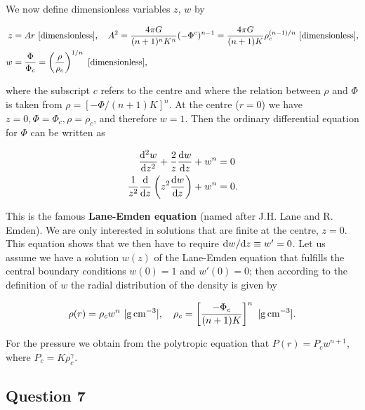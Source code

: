 \documentclass[a4paper,10pt]{article}
\begin{document}
{\noindent}We now define dimensionless variables $z$, $w$ by

\begin{align*}
    z &= Ar ~ [{\rm dimensionless}], ~~~ A^2 = \frac{4\pi G}{(n+1)^nK^n}(-\Phi^c)^{n-1} = \frac{4\pi G}{(n+1)K}\rho_c^{(n-1)/n} ~ [{\rm dimensionless}],\\
    w &= \frac{\Phi}{\Phi_c} = \left(\frac{\rho}{\rho_c}\right)^{1/n} ~ [{\rm dimensionless}],
\end{align*}

{\noindent}where the subscript $c$ refers to the centre and where the relation between $\rho$ and $\Phi$ is taken from $\rho=[-\Phi/(n+1)K]^n$. At the centre ($r=0$) we have $z=0, \Phi=\Phi_c, \rho=\rho_c$, and therefore $w=1$. Then the ordinary differential equation for $\Phi$ can be written as

\begin{align*}
    \frac{{\rm d}^2w}{{\rm d}z^2} +\frac{2}{z}\frac{{\rm d}w}{{\rm d}z} + w^n &= 0 \\
    \frac{1}{z^2}\frac{{\rm d}}{{\rm d}z} \left(z^2 \frac{{\rm d}w}{{\rm d}z}\right) + w^n &= 0.
\end{align*}

{\noindent}This is the famous \textbf{Lane-Emden equation} (named after J.H. Lane and R. Emden). We are only interested in solutions that are finite at the centre, $z=0$. This equation shows that we then have to require ${\rm d}w/{\rm d}z\equiv w'=0$. Let us assume we have a solution $w(z)$ of the Lane-Emden equation that fulfills the central boundary conditions $w(0)=1$ and $w'(0)=0$; then according to the definition of $w$ the radial distribution of the density is given by

\begin{align*}
    \rho(r) = \rho_cw^n ~ [{\rm g\,cm^{-3}}], ~~~ \rho_c = \left[ \frac{-\Phi_c}{(n+1)K} \right]^n ~ [{\rm g\,cm^{-3}}].
\end{align*}

{\noindent}For the pressure we obtain from the polytropic equation that $P(r)=P_cw^{n+1}$, where $P_c=K\rho_c^\gamma$.


\newpage
\subsection{Question 7}
\end{document}
